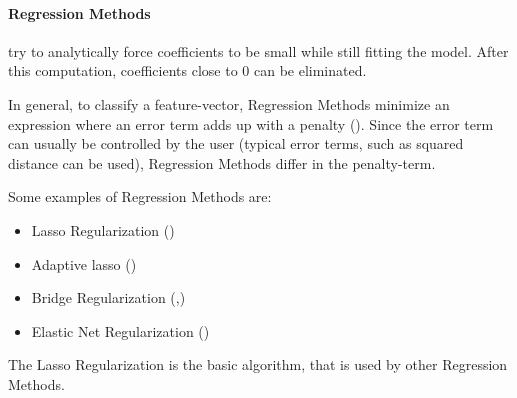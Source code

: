 \paragraph{Regression Methods}
\label{par:methods.flat.embedded.regression}


try to analytically force coefficients to be small while
still fitting the model. After this computation, coefficients close to $0$ can
be eliminated.

In general, to classify a feature-vector, Regression Methods minimize an
expression where an error term adds up with a penalty (\cite{Tang:14}). Since
the error term can usually be controlled by the user (typical error terms, such as squared
distance can be used), Regression Methods differ in the penalty-term.

Some examples of Regression Methods are:

\begin{itemize}
  \item Lasso Regularization (\cite{Tibshirani:96})
  \item Adaptive lasso (\cite{Zou:06})
  \item Bridge Regularization (\cite{Knight:00},\cite{Huang:08})
  \item Elastic Net Regularization (\cite{Zou:05})
\end{itemize}

The Lasso Regularization is the basic algorithm, that is used by other
Regression Methods.